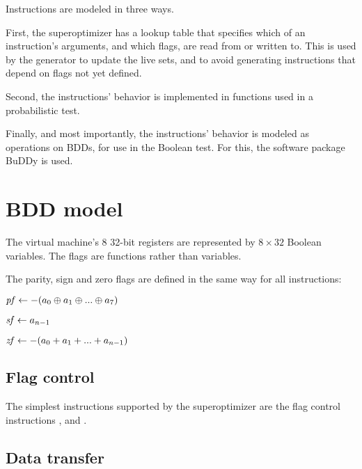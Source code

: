 \documentclass[a4paper,11pt]{kth-mag}
\renewcommand{\gets}{\leftarrow}
\newcommand{\IOR}{+}
\newcommand{\XOR}{\oplus}
\newcommand{\NOT}{-}
\begin{document}
Instructions are modeled in three ways.

First, the superoptimizer has a lookup table that specifies which of an instruction's arguments, and which flags, are read from or written to.
This is used by the generator to update the live sets, and to avoid generating instructions that depend on flags not yet defined.

Second, the instructions' behavior is implemented in functions used in a probabilistic test.

Finally, and most importantly, the instructions' behavior is modeled as operations on BDDs, for use in the Boolean test.
For this, the software package BuDDy \cite{buddy} is used.

\section{BDD model}

The virtual machine's 8 32-bit registers are represented by $8 \times 32$ Boolean variables. %
The flags are functions rather than variables.

The parity, sign and zero flags are defined in the same way for all instructions:

\begin{codebox}
\zi $\id{pf} \gets \NOT(a_0 \XOR a_1 \XOR ... \XOR a_7)$
\end{codebox}

\begin{codebox}
\zi $\id{sf} \gets a_{n-1}$
\end{codebox}

\begin{codebox}
\zi $\id{zf} \gets \NOT(a_0 \IOR a_1 \IOR ... \IOR a_{n-1})$
\end{codebox}

\subsection{Flag control}

The simplest instructions supported by the superoptimizer are the flag control instructions ,  and .

\subsection{Data transfer}
\end{document}
